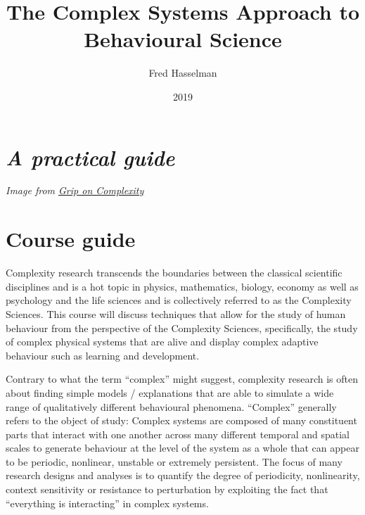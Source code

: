 \documentclass[12pt,]{book}
\title{The Complex Systems Approach to Behavioural Science}
\author{Fred Hasselman}
\date{2019}
\begin{document}
\maketitle

{
\setcounter{tocdepth}{1}
\tableofcontents
}
\hypertarget{a-practical-guide}{%
\chapter*{\texorpdfstring{\emph{A practical guide}}{A practical guide}}\label{a-practical-guide}}

\emph{Image from \href{http://www.nwo.nl/en/about-nwo/media/publications/ew/paper-grip-on-complexity.html}{Grip on Complexity}}

\hypertarget{course-guide}{%
\chapter*{\texorpdfstring{\textbf{Course guide}}{Course guide}}\label{course-guide}}

Complexity research transcends the boundaries between the classical scientific disciplines and is a hot topic in physics, mathematics, biology, economy as well as psychology and the life sciences and is collectively referred to as the Complexity Sciences. This course will discuss techniques that allow for the study of human behaviour from the perspective of the Complexity Sciences, specifically, the study of complex physical systems that are alive and display complex adaptive behaviour such as learning and development.

Contrary to what the term ``complex'' might suggest, complexity research is often about finding simple models / explanations that are able to simulate a wide range of qualitatively different behavioural phenomena. ``Complex'' generally refers to the object of study: Complex systems are composed of many constituent parts that interact with one another across many different temporal and spatial scales to generate behaviour at the level of the system as a whole that can appear to be periodic, nonlinear, unstable or extremely persistent. The focus of many research designs and analyses is to quantify the degree of periodicity, nonlinearity, context sensitivity or resistance to perturbation by exploiting the fact that ``everything is interacting'' in complex systems.
\end{document}
